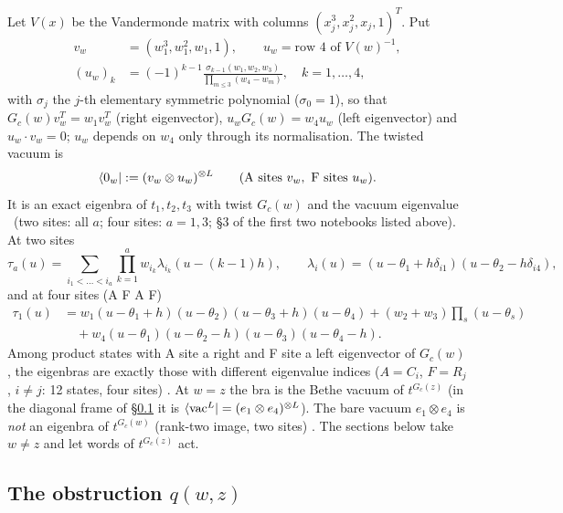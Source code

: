 Let $V(x)$ be the Vandermonde matrix with columns $(x_j^3,x_j^2,x_j,1)^T$. Put
\begin{align}
 v_w&=(w_1^3,w_1^2,w_1,1),\qquad u_w=\text{row 4 of }V(w)^{-1},\nonumber\\
 (u_w)_k&=(-1)^{k-1}\frac{\sigma_{k-1}(w_1,w_2,w_3)}{\prod_{m\le3}(w_4-w_m)},\quad k=1,\dots,4,
\end{align}
with $\sigma_j$ the $j$-th elementary symmetric polynomial ($\sigma_0=1$), so that $G_c(w)v_w^T=w_1v_w^T$ (right eigenvector), $u_wG_c(w)=w_4u_w$ (left eigenvector) and $u_w\cdot v_w=0$; $u_w$ depends on $w_4$
only through its normalisation. The twisted vacuum is
\begin{equation}
 \langle0_w|:=(v_w\otimes u_w)^{\otimes L}\qquad(\text{A sites }v_w,\ \text{F sites }u_w).
\end{equation}
It is an exact eigenbra of $t_1,t_2,t_3$ with twist $G_c(w)$ and the vacuum eigenvalue \ex\ (two sites: all $a$; four sites: $a=1,3$; \S3 of the first two notebooks listed above). At two sites
\begin{equation}
 \tau_a(u)=\sum_{i_1<\dots<i_a}\prod_{k=1}^aw_{i_k}\lambda_{i_k}(u-(k-1)h),\qquad
 \lambda_i(u)=(u-\theta_1+h\delta_{i1})(u-\theta_2-h\delta_{i4}),
\end{equation}
and at four sites (A F A F)
\begin{align}
 \tau_1(u)&=w_1(u-\theta_1+h)(u-\theta_2)(u-\theta_3+h)(u-\theta_4)+(w_2+w_3)\prod_s(u-\theta_s)\nonumber\\
 &\quad+w_4(u-\theta_1)(u-\theta_2-h)(u-\theta_3)(u-\theta_4-h).
\end{align}
Among product states with A site a right and F site a left eigenvector of $G_c(w)$, the eigenbras are exactly those with different eigenvalue
indices ($A=C_i$, $F=R_j$, $i\ne j$: 12 states, four sites) \ex. At $w=z$ the bra is the Bethe vacuum of $t^{G_c(z)}$ (in the diagonal frame of \S\ref{sec:twvac-q} it is $\langle\mathrm{vac}^L|=(e_1\otimes e_4)^{\otimes L}$). The bare vacuum $e_1\otimes e_4$ is \emph{not} an eigenbra of $t^{G_c(w)}$ (rank-two image, two sites) \ex.
The sections below take $w\ne z$ and let words of $t^{G_c(z)}$ act.

\subsection{The obstruction \texorpdfstring{$q(w,z)$}{q(w,z)}}\label{sec:twvac-q}


